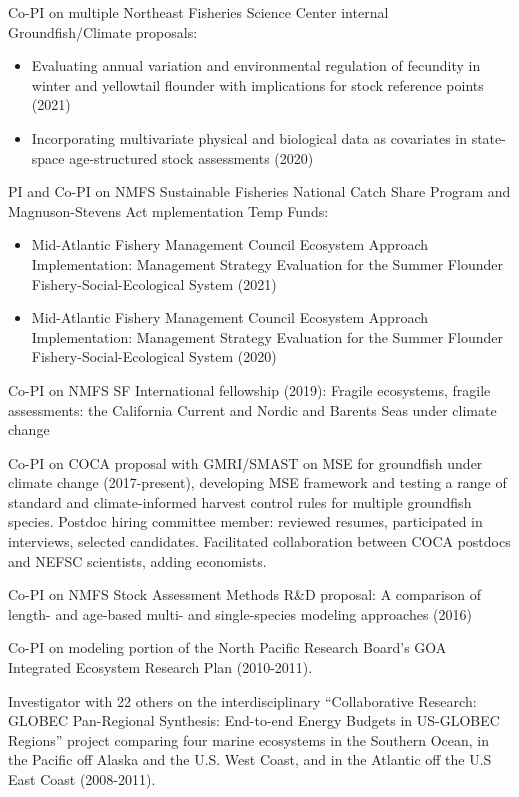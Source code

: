 \documentclass[11pt, a4paper]{awesome-cv}
\begin{document}
Co-PI on multiple Northeast Fisheries Science Center internal
Groundfish/Climate proposals:

\begin{itemize}
\item
  Evaluating annual variation and environmental regulation of fecundity
  in winter and yellowtail flounder with implications for stock
  reference points (2021)
\item
  Incorporating multivariate physical and biological data as covariates
  in state-space age-structured stock assessments (2020)
\end{itemize}

PI and Co-PI on NMFS Sustainable Fisheries National Catch Share Program
and Magnuson-Stevens Act mplementation Temp Funds:

\begin{itemize}
\item
  Mid-Atlantic Fishery Management Council Ecosystem Approach
  Implementation: Management Strategy Evaluation for the Summer Flounder
  Fishery-Social-Ecological System (2021)
\item
  Mid-Atlantic Fishery Management Council Ecosystem Approach
  Implementation: Management Strategy Evaluation for the Summer Flounder
  Fishery-Social-Ecological System (2020)
\end{itemize}

Co-PI on NMFS SF International fellowship (2019): Fragile ecosystems,
fragile assessments: the California Current and Nordic and Barents Seas
under climate change

Co-PI on COCA proposal with GMRI/SMAST on MSE for groundfish under
climate change (2017-present), developing MSE framework and testing a
range of standard and climate-informed harvest control rules for
multiple groundfish species. Postdoc hiring committee member: reviewed
resumes, participated in interviews, selected candidates. Facilitated
collaboration between COCA postdocs and NEFSC scientists, adding
economists.

Co-PI on NMFS Stock Assessment Methods R\&D proposal: A comparison of
length- and age-based multi- and single-species modeling approaches
(2016)

Co-PI on modeling portion of the North Pacific Research Board's GOA
Integrated Ecosystem Research Plan (2010-2011).

Investigator with 22 others on the interdisciplinary ``Collaborative
Research: GLOBEC Pan-Regional Synthesis: End-to-end Energy Budgets in
US-GLOBEC Regions'' project comparing four marine ecosystems in the
Southern Ocean, in the Pacific off Alaska and the U.S. West Coast, and
in the Atlantic off the U.S East Coast (2008-2011).
\end{document}
